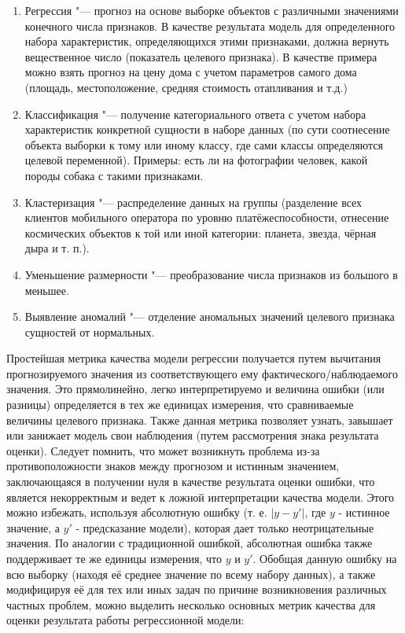 \documentclass[bachelor, och, coursework]{SCWorks}
\begin{document}
        \begin{enumerate}
            \item
                Регрессия "--- прогноз на основе выборке объектов с различными
                значениями конечного числа признаков. В качестве результата
                модель для определенного набора характеристик, определяющихся
                этими признаками, должна вернуть вещественное число (показатель
                целевого признака). В качестве примера можно взять прогноз на
                цену дома с учетом параметров самого дома (площадь,
                местоположение, средняя стоимость отапливания и т.д.)
            \item
                Классификация "--- получение категориального ответа с учетом
                набора характеристик конкретной сущности в наборе данных (по
                сути соотнесение объекта выборки к тому или иному классу, где
                сами классы определяются целевой переменной). Примеры: есть ли
                на фотографии человек, какой породы собака с такими признаками.
            \item
                Кластеризация "--- распределение данных на группы (разделение
                всех клиентов мобильного оператора по уровню платёжеспособности,
                отнесение космических объектов к той или иной категории:
                планета, звезда, чёрная дыра и т. п.).
            \item
                Уменьшение размерности "--- преобразование числа признаков из
                большого в меньшее.
            \item
                Выявление аномалий "--- отделение аномальных значений целевого
                признака сущностей от нормальных. 
        \end{enumerate}

        Простейшая метрика качества модели регрессии получается путем вычитания
        прогнозируемого значения из соответствующего ему
        фактического/наблюдаемого значения. Это прямолинейно, легко
        интерпретируемо и величина ошибки (или разницы) определяется в тех же
        единицах измерения, что сравниваемые величины целевого признака. Также
        данная метрика позволяет узнать, завышает или занижает модель свои
        наблюдения (путем рассмотрения знака результата оценки). Следует
        помнить, что может возникнуть проблема из-за противоположности знаков
        между прогнозом и истинным значением, заключающаяся в получении нуля в
        качестве результата оценки ошибки, что является некорректным и ведет к
        ложной интерпретации качества модели. Этого можно избежать, используя
        абсолютную ошибку (т. е. $|y - y'|$, где $y$ - истинное значение, а $y'$
        - предсказание модели), которая дает только неотрицательные значения. По
        аналогии с традиционной ошибкой, абсолютная ошибка также поддерживает те
        же единицы измерения, что $y$ и $y'$. Обобщая данную ошибку на всю
        выборку (находя её среднее значение по всему набору данных), а также
        модифицируя её для тех или иных задач по причине возникновения различных
        частных проблем, можно выделить несколько основных метрик качества для
        оценки результата работы регрессионной модели:
\end{document}
